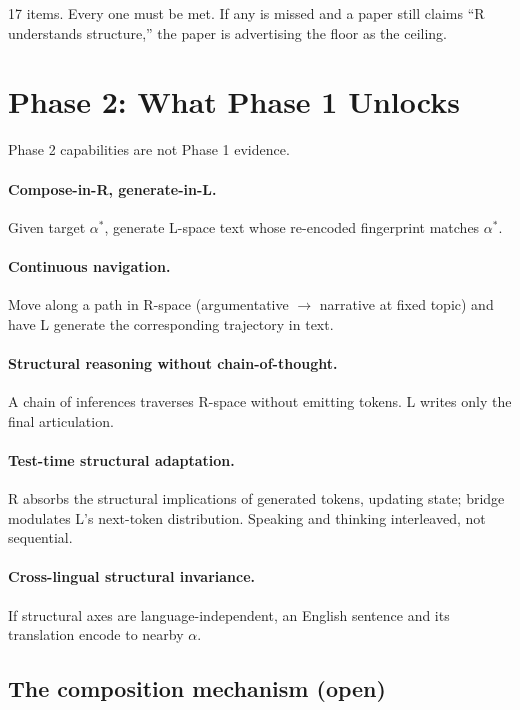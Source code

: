 \documentclass[10pt, twocolumn, a4paper]{article}
\begin{document}
17 items. Every one must be met. If any is missed and a paper still claims ``R understands structure,'' the paper is advertising the floor as the ceiling.


\section{Phase 2: What Phase 1 Unlocks}

Phase 2 capabilities are not Phase 1 evidence.

\paragraph{Compose-in-R, generate-in-L.} Given target $\alpha^*$, generate L-space text whose re-encoded fingerprint matches $\alpha^*$.

\paragraph{Continuous navigation.} Move along a path in R-space (argumentative $\to$ narrative at fixed topic) and have L generate the corresponding trajectory in text.

\paragraph{Structural reasoning without chain-of-thought.} A chain of inferences traverses R-space without emitting tokens. L writes only the final articulation.

\paragraph{Test-time structural adaptation.} R absorbs the structural implications of generated tokens, updating state; bridge modulates L's next-token distribution. Speaking and thinking interleaved, not sequential.

\paragraph{Cross-lingual structural invariance.} If structural axes are language-independent, an English sentence and its translation encode to nearby $\alpha$.

\subsection*{The composition mechanism (open)}
\end{document}
